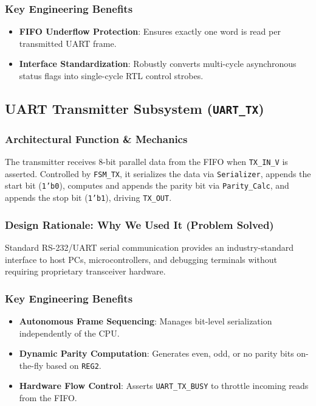 \documentclass[11pt,a4paper]{article}
\begin{document}
\subsubsection{Key Engineering Benefits}
\begin{itemize}
    \item \textbf{FIFO Underflow Protection}: Ensures exactly one word is read per transmitted UART frame.
    \item \textbf{Interface Standardization}: Robustly converts multi-cycle asynchronous status flags into single-cycle RTL control strobes.
\end{itemize}

\subsection{UART Transmitter Subsystem (\texttt{UART\_TX})}

\subsubsection{Architectural Function \& Mechanics}
The transmitter receives 8-bit parallel data from the FIFO when \texttt{TX\_IN\_V} is asserted. Controlled by \texttt{FSM\_TX}, it serializes the data via \texttt{Serializer}, appends the start bit (\texttt{1'b0}), computes and appends the parity bit via \texttt{Parity\_Calc}, and appends the stop bit (\texttt{1'b1}), driving \texttt{TX\_OUT}.

\subsubsection{Design Rationale: Why We Used It (Problem Solved)}
Standard RS-232/UART serial communication provides an industry-standard interface to host PCs, microcontrollers, and debugging terminals without requiring proprietary transceiver hardware.

\subsubsection{Key Engineering Benefits}
\begin{itemize}
    \item \textbf{Autonomous Frame Sequencing}: Manages bit-level serialization independently of the CPU.
    \item \textbf{Dynamic Parity Computation}: Generates even, odd, or no parity bits on-the-fly based on \texttt{REG2}.
    \item \textbf{Hardware Flow Control}: Asserts \texttt{UART\_TX\_BUSY} to throttle incoming reads from the FIFO.
\end{itemize}
\end{document}
